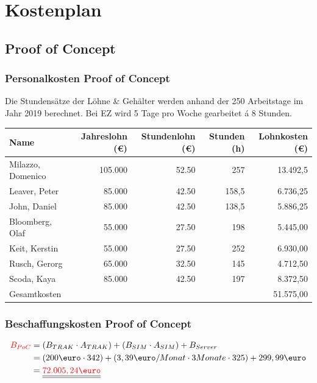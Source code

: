 \documentclass[a4paper,10pt]{scrartcl}
\begin{document}
\section{Kostenplan}
\subsection{Proof of Concept}
\subsubsection{Personalkosten Proof of Concept}
Die Stundensätze der Löhne \& Gehälter werden anhand der 250 Arbeitstage im Jahr 2019 berechnet. Bei EZ wird 5 Tage pro Woche gearbeitet á 8 Stunden.
\hfill \vspace{5mm}
\begin{tabular}{lrrrr} 
\toprule
\textbf{Name} & \textbf{Jahreslohn (\euro{})} & \textbf{Stundenlohn (\euro{})} & \textbf{Stunden (h)} & \textbf{Lohnkosten (\euro{})}\\ 
\midrule 
Milazzo, Domenico  & 105.000 & 52.50 & 257 & 13.492,5\\
Leaver, Peter  & 85.000 & 42.50 & 158,5 & 6.736,25\\
John, Daniel  & 85.000 & 42.50 & 138,5 & 5.886,25\\
Bloomberg, Olaf  & 55.000 & 27.50 & 198 & 5.445,00\\
Keit, Kerstin  & 55.000 & 27.50 & 252 & 6.930,00\\
Rusch, Gerorg & 65.000 & 32.50 & 145 & 4.712,50\\
Scoda, Kaya & 85.000 & 42.50 & 197 & 8.372,50\\
\midrule 
\midrule 
Gesamtkosten &  &  &  & 51.575,00\\ 
\bottomrule
\end{tabular}

\subsubsection{Beschaffungskosten Proof of Concept}
\begin{equation}
\begin{split}
\textcolor{red}{B_{PoC}} &= (B_{TRAK} \cdot A_{TRAK}) + (B_{SIM} \cdot A_{SIM})
+ B_{Server} \\\
&= (200 \text{\euro} \cdot 342) + (3,39 \text{\euro}/Monat \cdot 3 Monate \cdot 325) + 299,99 \text{\euro}  \\\
&= \underline{\underline{\textcolor{red}{72.005,24\text{\euro}}}}
\end{split}
\end{equation}
\end{document}

